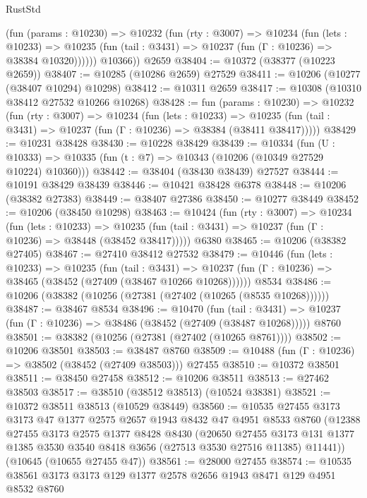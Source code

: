 \begin{lexlean}{RustStd}
\begin{coremodule}
          (fun (params : @10230) =>
          @10232
            (fun (rty : @3007) =>
            @10234
              (fun (lets : @10233) =>
              @10235 (fun (tail : @3431) => @10237 (fun (Γ : @10236) => @38384 @10320))))))
        @10366))
    @2659
@38404 := @10372 (@38377 (@10223 @2659))
@38407 := @10285 (@10286 @2659) @27529
@38411 := @10206 (@10277 (@38407 @10294) @10298)
@38412 := @10311 @2659
@38417 := @10308 (@10310 @38412 @27532 @10266 @10268)
@38428 := fun (params : @10230) =>
  @10232
    (fun (rty : @3007) =>
    @10234
      (fun (lets : @10233) =>
      @10235 (fun (tail : @3431) => @10237 (fun (Γ : @10236) => @38384 (@38411 @38417)))))
@38429 := @10231 @38428
@38430 := @10228 @38429
@38439 := @10334
    (fun (U : @10333) => @10335 (fun (t : @7) => @10343 (@10206 (@10349 @27529 @10224) @10360)))
@38442 := @38404 (@38430 @38439) @27527
@38444 := @10191 @38429 @38439
@38446 := @10421 @38428 @6378
@38448 := @10206 (@38382 @27383)
@38449 := @38407 @27386
@38450 := @10277 @38449
@38452 := @10206 (@38450 @10298)
@38463 := @10424
    (fun (rty : @3007) =>
    @10234
      (fun (lets : @10233) =>
      @10235 (fun (tail : @3431) => @10237 (fun (Γ : @10236) => @38448 (@38452 @38417)))))
    @6380
@38465 := @10206 (@38382 @27405)
@38467 := @27410 @38412 @27532
@38479 := @10446
    (fun (lets : @10233) =>
    @10235
      (fun (tail : @3431) =>
      @10237 (fun (Γ : @10236) => @38465 (@38452 (@27409 (@38467 @10266 @10268))))))
    @8534
@38486 := @10206 (@38382 (@10256 (@27381 (@27402 (@10265 (@8535 @10268))))))
@38487 := @38467 @8534
@38496 := @10470
    (fun (tail : @3431) => @10237 (fun (Γ : @10236) => @38486 (@38452 (@27409 (@38487 @10268)))))
    @8760
@38501 := @38382 (@10256 (@27381 (@27402 (@10265 @8761))))
@38502 := @10206 @38501
@38503 := @38487 @8760
@38509 := @10488 (fun (Γ : @10236) => @38502 (@38452 (@27409 @38503))) @27455
@38510 := @10372 @38501
@38511 := @38450 @27458
@38512 := @10206 @38511
@38513 := @27462 @38503
@38517 := @38510 (@38512 @38513) (@10524 @38381)
@38521 := @10372 @38511 @38513 (@10529 @38449)
@38560 := @10535
    @27455
    @3173
    @3173
    @47
    @1377
    @2575
    @2657
    @1943
    @8432
    @47
    @4951
    @8533
    @8760
    (@12388
      @27455
      @3173
      @2575
      @1377
      @8428
      @8430
      (@20650
        @27455
        @3173
        @131
        @1377
        @1385
        @3530
        @3540
        @8418
        @3656
        (@27513 @3530 @27516 @11385)
        @11441))
    (@10645 (@10655 @27455 @47))
@38561 := @28000 @27455
@38574 := @10535 @38561 @3173 @3173 @129 @1377 @2578 @2656 @1943 @8471 @129 @4951 @8532 @8760

\end{coremodule}
\end{lexlean}
